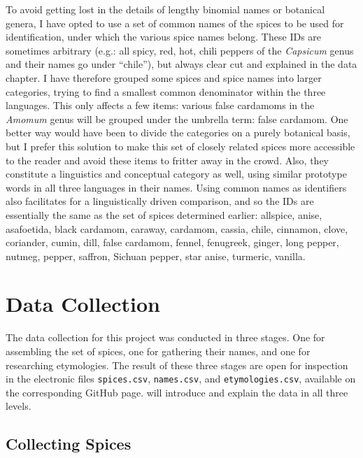 To avoid getting lost in the details of lengthy binomial names or botanical genera, I have opted to use a set of common names of the spices to be used for identification, under which the various spice names belong. These IDs are sometimes arbitrary (e.g.: all spicy, red, hot, chili peppers of the \textit{Capsicum} genus and their names go under ``chile''), but always clear cut and explained in the data chapter. I have therefore grouped some spices and spice names into larger categories, trying to find a smallest common denominator within the three languages. This only affects a few items: various false cardamoms in the \textit{Amomum} genus will be grouped under the umbrella term: false cardamom. One better way would have been to divide the categories on a purely botanical basis, but I prefer this solution to make this set of closely related spices more accessible to the reader and avoid these items to fritter away in the crowd. Also, they constitute a linguistics and conceptual category as well, using similar prototype words in all three languages in their names. Using common names as identifiers also facilitates for a linguistically driven comparison, and so the IDs are essentially the same as the set of spices determined earlier: allspice, anise, asafoetida, black cardamom, caraway, cardamom, cassia, chile, cinnamon, clove, coriander, cumin, dill, false cardamom, fennel, fenugreek, ginger, long pepper, nutmeg, pepper, saffron, Sichuan pepper, star anise, turmeric, vanilla.

\section{Data Collection}
\label{sec:data_collection}


The data collection for this project was conducted in three stages. One for assembling the set of spices, one for gathering their names, and one for researching etymologies. The result of these three stages are open for inspection in the electronic files \texttt{spices.csv}, \texttt{names.csv}, and \texttt{etymologies.csv}, available on the corresponding GitHub page.   will introduce and explain the data in all three levels.

\subsection{Collecting Spices}
\label{sec:collecting_spices}

